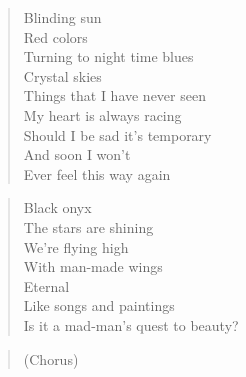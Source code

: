 \begin{minipage}{0.5\textwidth}

    \begin{verse}
    Blinding sun \\
	Red colors \\
	Turning to night time blues \\
	Crystal skies \\
	Things that I have never seen \\
	My heart is always racing \\
	Should I be sad it's temporary \\
	And soon I won't \\
	Ever feel this way again
    \end{verse}
    
    \begin{verse}
    Black onyx \\
	The stars are shining \\
	We're flying high \\
	With man-made wings \\
	Eternal \\
	Like songs and paintings \\
	Is it a mad-man's quest to beauty?
    \end{verse}

    \begin{verse}
    (Chorus)
    \end{verse}


\end{minipage}
\clearpage
